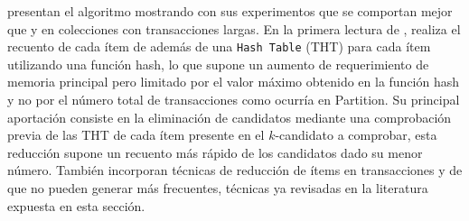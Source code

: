 
\citet{HoltChung-MiningARusingInvertedHashingAndPruning-2002} presentan el algoritmo  mostrando con sus experimentos que se comportan mejor que \apriori y  en colecciones con transacciones largas. En la primera lectura de \D,  realiza el recuento de cada ítem de \I además de una \TID \texttt{Hash Table} (THT) para cada ítem utilizando una función hash, lo que supone un aumento de requerimiento de memoria principal pero limitado por el valor máximo obtenido en la función hash y no por el número total de transacciones como ocurría en Partition. Su principal aportación consiste en la eliminación de candidatos mediante una comprobación previa de las THT de cada ítem presente en el $k$-candidato a comprobar, esta reducción supone un recuento más rápido de los candidatos dado su menor número. También incorporan técnicas de reducción de ítems en transacciones y de \transacciones que no pueden generar más \kitemsets frecuentes, técnicas ya revisadas en la literatura expuesta en esta sección.



